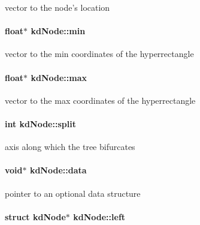 vector to the node's location \hypertarget{structkdNode_585a4ffcc5380a36dd73ba1757b3e0ef}{
\paragraph[min]{\setlength{\rightskip}{0pt plus 5cm}float$\ast$ {\bf kdNode::min}}\hfill}
\label{structkdNode_585a4ffcc5380a36dd73ba1757b3e0ef}


vector to the min coordinates of the hyperrectangle \hypertarget{structkdNode_2d19c9682f6e0a51b571cfb81fb29c94}{
\paragraph[max]{\setlength{\rightskip}{0pt plus 5cm}float$\ast$ {\bf kdNode::max}}\hfill}
\label{structkdNode_2d19c9682f6e0a51b571cfb81fb29c94}


vector to the max coordinates of the hyperrectangle \hypertarget{structkdNode_4750628c6641e6f346c1e2e20212e41d}{
\paragraph[split]{\setlength{\rightskip}{0pt plus 5cm}int {\bf kdNode::split}}\hfill}
\label{structkdNode_4750628c6641e6f346c1e2e20212e41d}


axis along which the tree bifurcates \hypertarget{structkdNode_c106e27d76af679582b4c8096a16402d}{
\paragraph[data]{\setlength{\rightskip}{0pt plus 5cm}void$\ast$ {\bf kdNode::data}}\hfill}
\label{structkdNode_c106e27d76af679582b4c8096a16402d}


pointer to an optional data structure \hypertarget{structkdNode_d797c034d815bcf07ed2d8ce42b4d3c7}{
\paragraph[left]{\setlength{\rightskip}{0pt plus 5cm}struct {\bf kdNode}$\ast$ {\bf kdNode::left}}\hfill}
\label{structkdNode_d797c034d815bcf07ed2d8ce42b4d3c7}


